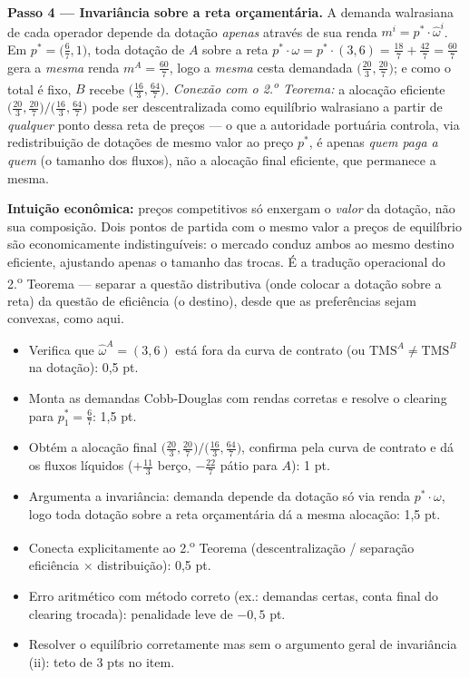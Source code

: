 \begin{solucao}
\textbf{Passo 4 --- Invariância sobre a reta orçamentária.} A demanda walrasiana de cada operador depende da dotação \emph{apenas} através de sua renda $m^i = p^{*}\cdot\hat\omega^i$. Em $p^{*}=\big(\tfrac{6}{7},1\big)$, toda dotação de $A$ sobre a reta $p^{*}\cdot\omega = p^{*}\cdot(3,6) = \tfrac{18}{7}+\tfrac{42}{7}=\tfrac{60}{7}$ gera a \emph{mesma} renda $m^A=\tfrac{60}{7}$, logo a \emph{mesma} cesta demandada $\big(\tfrac{20}{3},\tfrac{20}{7}\big)$; e como o total é fixo, $B$ recebe $\big(\tfrac{16}{3},\tfrac{64}{7}\big)$. \emph{Conexão com o 2.\textsuperscript{o} Teorema:} a alocação eficiente $\big(\tfrac{20}{3},\tfrac{20}{7}\big)/\big(\tfrac{16}{3},\tfrac{64}{7}\big)$ pode ser descentralizada como equilíbrio walrasiano a partir de \emph{qualquer} ponto dessa reta de preços --- o que a autoridade portuária controla, via redistribuição de dotações de mesmo valor ao preço $p^{*}$, é apenas \emph{quem paga a quem} (o tamanho dos fluxos), não a alocação final eficiente, que permanece a mesma.

\textbf{Intuição econômica:} preços competitivos só enxergam o \emph{valor} da dotação, não sua composição. Dois pontos de partida com o mesmo valor a preços de equilíbrio são economicamente indistinguíveis: o mercado conduz ambos ao mesmo destino eficiente, ajustando apenas o tamanho das trocas. É a tradução operacional do 2.\textsuperscript{o} Teorema --- separar a questão distributiva (onde colocar a dotação sobre a reta) da questão de eficiência (o destino), desde que as preferências sejam convexas, como aqui.
\rubricalabel
\begin{itemize}
\item Verifica que $\hat\omega^A=(3,6)$ está fora da curva de contrato (ou $\text{TMS}^A\neq\text{TMS}^B$ na dotação): 0{,}5 pt.
\item Monta as demandas Cobb-Douglas com rendas corretas e resolve o clearing para $p_1^{*}=\tfrac{6}{7}$: 1{,}5 pt.
\item Obtém a alocação final $\big(\tfrac{20}{3},\tfrac{20}{7}\big)/\big(\tfrac{16}{3},\tfrac{64}{7}\big)$, confirma pela curva de contrato e dá os fluxos líquidos ($+\tfrac{11}{3}$ berço, $-\tfrac{22}{7}$ pátio para $A$): 1 pt.
\item Argumenta a invariância: demanda depende da dotação só via renda $p^{*}\cdot\omega$, logo toda dotação sobre a reta orçamentária dá a mesma alocação: 1{,}5 pt.
\item Conecta explicitamente ao 2.\textsuperscript{o} Teorema (descentralização / separação eficiência $\times$ distribuição): 0{,}5 pt.
\item Erro aritmético com método correto (ex.: demandas certas, conta final do clearing trocada): penalidade leve de $-0{,}5$ pt.
\item Resolver o equilíbrio corretamente mas sem o argumento geral de invariância (ii): teto de 3 pts no item.
\end{itemize}
\end{solucao}


